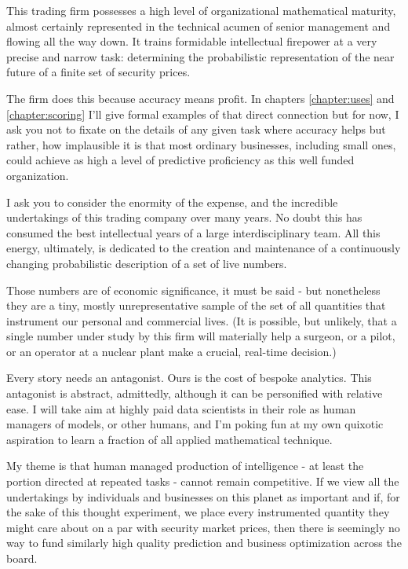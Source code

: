 This trading firm possesses a high level of organizational mathematical maturity, almost certainly represented in the technical acumen of senior management and flowing all the way down. It trains formidable intellectual firepower at a very precise and narrow task: determining the probabilistic representation of the near future of a finite set of security prices. 

The firm does this because accuracy means profit. In chapters \ref{chapter:uses} and \ref{chapter:scoring} I'll give formal examples of that direct connection but for now, I ask you not to fixate on the details of any given task where accuracy helps but rather, how implausible it is that most ordinary businesses, including small ones, could achieve as high a level of predictive proficiency as this well funded organization. 

I ask you to consider the enormity of the expense, and the incredible undertakings of this trading company over many years. No doubt this has consumed the best intellectual years of a large interdisciplinary team. All this energy, ultimately, is dedicated to the creation and maintenance of a continuously changing probabilistic description of a set of live numbers. 

Those numbers are of economic significance, it must be said - but nonetheless they are a tiny, mostly unrepresentative sample of the set of all quantities that instrument our personal and commercial lives. (It is possible, but unlikely, that a single number under study by this firm will materially help a surgeon, or a pilot, or an operator at a nuclear plant make a crucial, real-time decision.) 

Every story needs an antagonist. Ours is the cost of bespoke analytics. This antagonist is abstract, admittedly, although it can be personified with relative ease. I will take aim at highly paid data scientists in their role as human managers of models, or other humans, and I'm poking fun at my own quixotic aspiration to learn a fraction of all applied mathematical technique. 

My theme is that human managed production of intelligence - at least the portion directed at repeated tasks - cannot remain competitive. If we view all the undertakings by individuals and businesses on this planet as important and if, for the sake of this thought experiment, we place every instrumented quantity they might care about on a par with security market prices, then there is seemingly no way to fund similarly high quality prediction and business optimization across the board.


